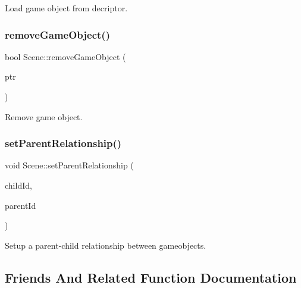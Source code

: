Load game object from decriptor. 

\hypertarget{class_mason_1_1_scene_aad5427fcdd330f65dc4e7b1e627afce4}{}\label{class_mason_1_1_scene_aad5427fcdd330f65dc4e7b1e627afce4} 
\subsubsection{\texorpdfstring{remove\+Game\+Object()}{removeGameObject()}}
{\footnotesize\ttfamily bool Scene\+::remove\+Game\+Object (\begin{DoxyParamCaption}\item[{std\+::shared\+\_\+ptr$<$ \hyperlink{class_mason_1_1_game_object}{Game\+Object} $>$}]{ptr }\end{DoxyParamCaption})}



Remove game object. 

\hypertarget{class_mason_1_1_scene_a2d10aca9d364dc70935795a1436f353d}{}\label{class_mason_1_1_scene_a2d10aca9d364dc70935795a1436f353d} 
\subsubsection{\texorpdfstring{set\+Parent\+Relationship()}{setParentRelationship()}}
{\footnotesize\ttfamily void Scene\+::set\+Parent\+Relationship (\begin{DoxyParamCaption}\item[{int}]{child\+Id,  }\item[{int}]{parent\+Id }\end{DoxyParamCaption})}



Setup a parent-\/child relationship between gameobjects. 



\subsection{Friends And Related Function Documentation}
\hypertarget{class_mason_1_1_scene_a3e1914489e4bed4f9f23cdeab34a43dc}{}\label{class_mason_1_1_scene_a3e1914489e4bed4f9f23cdeab34a43dc} 
